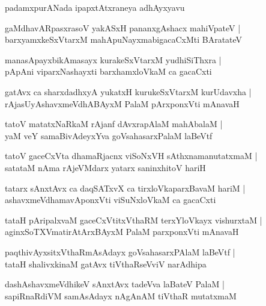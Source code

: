 \documentclass[twoside,12pt,openright]{book}
\newcounter{shloka}[chapter]
\begin{document}
\begin{center}
padamxpurANada ipapxtAtxraneya adhAyxyavu
\end{center}

\begin{shloka}
gaMdhavARpasxrasoV yakASxH pananxgAshacx mahiVpateV |\\
barxyamxkeSxVtarxM mahApuNayxmabigacaCxMti BAratateV 
\end{shloka}

\begin{shloka}
manasApayxbikAmasayx kurakeSxVtarxM yudhiSiThxra |\\
pApAni viparxNashayxti barxhamxloVkaM ca gacaCxti 
\end{shloka}

\begin{shloka}
gatAvx ca sharxdadhxyA yukatxH kurukeSxVtarxM kurUdavxha |\\
rAjasUyAshavxmeVdhABAyxM PalaM pArxponxVti mAnavaH 
\end{shloka}

\begin{shloka}
tatoV matatxNaRkaM rAjanf dAvxrapAlaM mahAbalaM |\\
yaM veY samaBivAdeyxYva goVsahasarxPalaM laBeVtf 
\end{shloka}

\begin{shloka}
tatoV gaceCxVta dhamaRjacnx viSoNxVH sAthxnamanutatxmaM |\\
satataM nAma rAjeVMdarx yatarx saninxhitoV hariH
\end{shloka}

\begin{shloka}
tatarx sAnxtAvx ca daqSATxvX ca tirxloVkaparxBavaM hariM |\\
ashavxmeVdhamavAponxVti viSuNxloVkaM ca gacaCxti 
\end{shloka}

\begin{shloka}
tataH pAripalxvaM gaceCxVtitxVthaRM terxYloVkayx vishurxtaM |\\
aginxSoTXVmatirAtArxBAyxM PalaM parxponxVti mAnavaH 
\end{shloka}

\begin{shloka}
paqthivAyxsitxVthaRmAsAdayx goVsahasarxPAlaM laBeVtf |\\
tataH  shalivxkinaM gatAvx tiVthaRseVviV narAdhipa
\end{shloka}

\begin{shloka}
dashAshavxmeVdhikeV sAnxtAvx tadeVva laBateV PalaM |\\
sapiRnaRdiVM samAsAdayx nAgAnAM tiVthaR mutatxmaM
\end{shloka}
\end{document}
